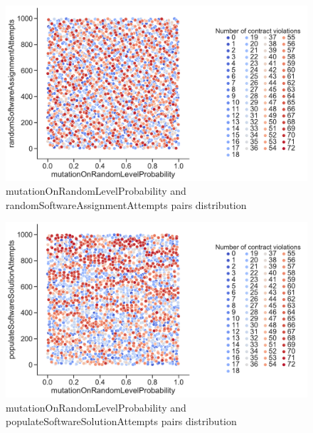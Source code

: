 \begin{figure}
	\centering
	\includegraphics[width=\textwidth]{images/PairsDistr/mutationOnRandomLevelProbability_randomSoftwareAssignmentAttempts.pdf}
	\caption[mutationOnRandomLevelProbability and randomSoftwareAssignmentAttempts pairs distribution]{mutationOnRandomLevelProbability and randomSoftwareAssignmentAttempts pairs distribution} 
	\label{fig:mutationOnRandomLevelProbability_randomSoftwareAssignmentAttempts_pair}
\end{figure}
\begin{figure}
	\centering
	\includegraphics[width=\textwidth]{images/PairsDistr/mutationOnRandomLevelProbability_populateSoftwareSolutionAttempts.pdf}
	\caption[mutationOnRandomLevelProbability and populateSoftwareSolutionAttempts pairs distribution]{mutationOnRandomLevelProbability and populateSoftwareSolutionAttempts pairs distribution} 
	\label{fig:mutationOnRandomLevelProbability_populateSoftwareSolutionAttempts_pair}
\end{figure}
